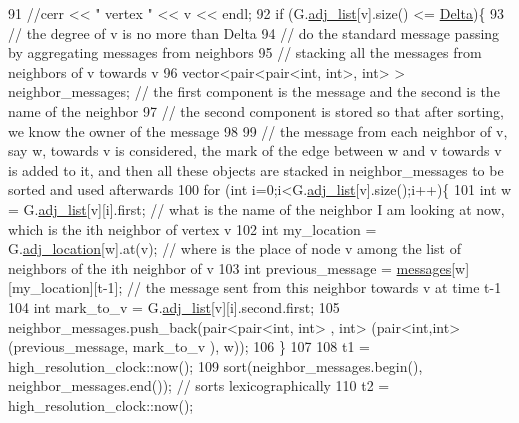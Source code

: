 \begin{DoxyCode}
91       \textcolor{comment}{//cerr << " vertex " << v << endl;}
92       \textcolor{keywordflow}{if} (G.\hyperlink{classmarked__graph_a1a0bf7ca413a278763f7c878b3b6fd6f}{adj\_list}[v].size() <= \hyperlink{classgraph__message_a45dfd061b7bc73572e5132fbf66efd55}{Delta})\{
93         \textcolor{comment}{// the degree of v is no more than Delta}
94         \textcolor{comment}{// do the standard message passing by aggregating messages from neighbors}
95         \textcolor{comment}{// stacking all the messages from neighbors of v towards v}
96         vector<pair<pair<int, int>, \textcolor{keywordtype}{int}> > neighbor\_messages; \textcolor{comment}{// the first component is the message and the
       second is the name of the neighbor}
97         \textcolor{comment}{// the second component is stored so that after sorting, we know the owner of the message}
98 
99         \textcolor{comment}{// the message from each neighbor of v, say w,  towards v is considered, the mark of the edge
       between w and v towards v is added to it, and then all these objects are stacked in neighbor\_messages to be
       sorted and used afterwards }
100         \textcolor{keywordflow}{for} (\textcolor{keywordtype}{int} i=0;i<G.\hyperlink{classmarked__graph_a1a0bf7ca413a278763f7c878b3b6fd6f}{adj\_list}[v].size();i++)\{
101           \textcolor{keywordtype}{int} w = G.\hyperlink{classmarked__graph_a1a0bf7ca413a278763f7c878b3b6fd6f}{adj\_list}[v][i].first; \textcolor{comment}{// what is the name of the neighbor I am looking at now,
       which is the ith neighbor of vertex v }
102           \textcolor{keywordtype}{int} my\_location = G.\hyperlink{classmarked__graph_a3ae722ea9583ad23af34d789a88ac01a}{adj\_location}[w].at(v); \textcolor{comment}{// where is the place of node v among the
       list of neighbors of the ith neighbor of v}
103           \textcolor{keywordtype}{int} previous\_message = \hyperlink{classgraph__message_aac77e098f0acf9650116a8e51fe3b4b7}{messages}[w][my\_location][t-1]; \textcolor{comment}{// the message sent from this
       neighbor towards v at time t-1}
104           \textcolor{keywordtype}{int} mark\_to\_v = G.\hyperlink{classmarked__graph_a1a0bf7ca413a278763f7c878b3b6fd6f}{adj\_list}[v][i].second.first;
105           neighbor\_messages.push\_back(pair<pair<int, int> , \textcolor{keywordtype}{int}> (pair<int,int>(previous\_message, mark\_to\_v
      ), w));
106         \}
107 
108         t1 = high\_resolution\_clock::now();
109         sort(neighbor\_messages.begin(), neighbor\_messages.end()); \textcolor{comment}{// sorts lexicographically}
110         t2 = high\_resolution\_clock::now();

\end{DoxyCode}
